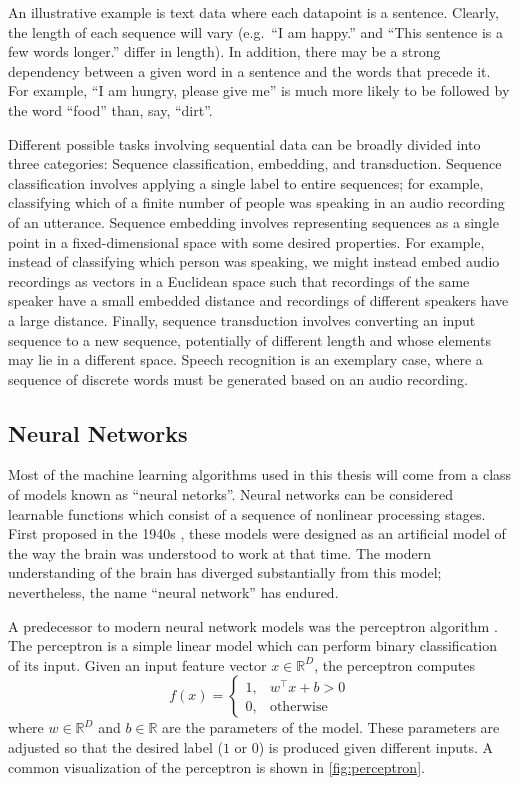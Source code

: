 An illustrative example is text data where each datapoint is a sentence.
Clearly, the length of each sequence will vary (e.g.\ ``I am happy.'' and ``This sentence is a few words longer.'' differ in length).
In addition, there may be a strong dependency between a given word in a sentence and the words that precede it.
For example, ``I am hungry, please give me'' is much more likely to be followed by the word ``food'' than, say, ``dirt''.

Different possible tasks involving sequential data can be broadly divided into three categories: Sequence classification, embedding, and transduction.
Sequence classification involves applying a single label to entire sequences; for example, classifying which of a finite number of people was speaking in an audio recording of an utterance.
Sequence embedding involves representing sequences as a single point in a fixed-dimensional space with some desired properties.
For example, instead of classifying which person was speaking, we might instead embed audio recordings as vectors in a Euclidean space such that recordings of the same speaker have a small embedded distance and recordings of different speakers have a large distance.
Finally, sequence transduction involves converting an input sequence to a new sequence, potentially of different length and whose elements may lie in a different space.
Speech recognition is an exemplary case, where a sequence of discrete words must be generated based on an audio recording.

\subsection{Neural Networks}

Most of the machine learning algorithms used in this thesis will come from a class of models known as ``neural netorks''.
Neural networks can be considered learnable functions which consist of a sequence of nonlinear processing stages.
First proposed in the 1940s \cite{mcculloch1943logical,hebb1949organization}, these models were designed as an artificial model of the way the brain was understood to work at that time.
The modern understanding of the brain has diverged substantially from this model; nevertheless, the name ``neural network'' has endured.

A predecessor to modern neural network models was the perceptron algorithm \cite{rosenblatt1958perceptron}.
The perceptron is a simple linear model which can perform binary classification of its input.
Given an input feature vector $x \in \mathbb{R}^D$, the perceptron computes
\begin{equation}
f(x) = \begin{cases}
1,& w^\top x + b > 0\\
0,& \mathrm{otherwise}
\end{cases}
\label{eq:perceptron}
\end{equation}
where $w \in \mathbb{R}^D$ and $b \in \mathbb{R}$ are the parameters of the model.
These parameters are adjusted so that the desired label ($1$ or $0$) is produced given different inputs.
A common visualization of the perceptron is shown in \cref{fig:perceptron}.

